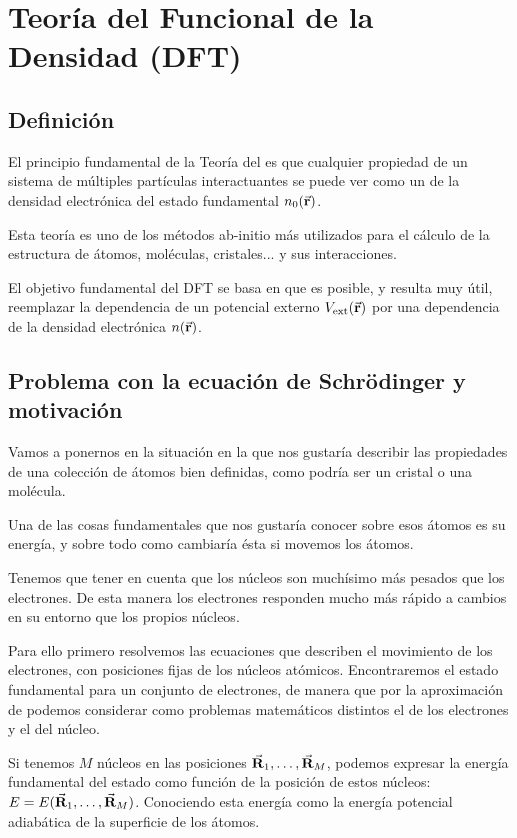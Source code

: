\section{Teoría del Funcional de la Densidad (DFT)}

\subsection{Definición}

El principio fundamental de la Teoría del  es que cualquier propiedad de un sistema de múltiples partículas interactuantes se puede ver como un  de la densidad electrónica del estado fundamental $n_0 (\va{r})$.

Esta teoría es uno de los métodos ab-initio más utilizados para el cálculo de la estructura de átomos, moléculas, cristales... y sus interacciones.

El objetivo fundamental del DFT se basa en que es posible, y resulta muy útil, reemplazar la dependencia de un potencial externo $V_{\text{ext}}(\va{r})$ por una dependencia de la densidad electrónica $n(\va{r})$.

\subsection{Problema con la ecuación de Schrödinger y motivación} 

Vamos a ponernos en la situación en la que nos gustaría describir las propiedades de una colección de átomos bien definidas, como podría ser un cristal o una molécula.

Una de las cosas fundamentales que nos gustaría conocer sobre esos átomos es su energía, y sobre todo como cambiaría ésta si movemos los átomos.

Tenemos que tener en cuenta que los núcleos son muchísimo más pesados que los electrones. De esta manera los electrones responden mucho más rápido a cambios en su entorno que los propios núcleos.

Para ello primero resolvemos las ecuaciones que describen el movimiento de los electrones, con posiciones fijas de los núcleos atómicos. Encontraremos el estado fundamental para un conjunto de electrones, de manera que por la aproximación de  podemos considerar como problemas matemáticos distintos el de los electrones y el del núcleo.

Si tenemos $M$ núcleos en las posiciones $\va{R}_1 , \dots , \va{R}_M$, podemos expresar la energía fundamental del estado como función de la posición de estos núcleos: $E = E(\va{R}_1 , \dots , \va{R}_M)$. Conociendo esta energía como la energía potencial adiabática de la superficie de los átomos.

